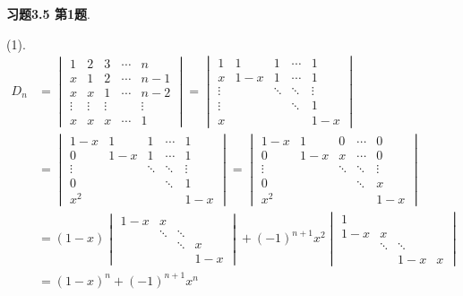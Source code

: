\renewcommand{\newpageorvspace}{\vspace{2em}}

\date{第八次作业}



\maketitle

{\bf 习题3.5 第1题}.

(1). 
\begin{align*}
D_n & = \begin{vmatrix} 1 & 2 & 3 & \cdots & n \\ x & 1 & 2 & \cdots & n-1 \\ x & x & 1 & \cdots & n-2 \\ \vdots & \vdots & \vdots & & \vdots \\ x & x & x & \cdots & 1 \end{vmatrix} = \begin{vmatrix} 1 & 1 & 1 & \cdots & 1 \\ x & 1-x & 1 & \cdots & 1 \\ \vdots & & \ddots & \ddots & \vdots \\ \vdots & & & \ddots & 1 \\ x & & & & 1-x \end{vmatrix} \\
& = \begin{vmatrix} 1-x & 1 & 1 & \cdots & 1 \\ 0 & 1-x & 1 & \cdots & 1 \\ \vdots & & \ddots & \ddots & \vdots \\ 0 & & & \ddots & 1 \\ x^2 & & & & 1-x \end{vmatrix} = \begin{vmatrix} 1-x & 1 & 0 & \cdots & 0 \\ 0 & 1-x & x & \cdots & 0 \\ \vdots & & \ddots & \ddots & \vdots \\ 0 & & & \ddots & x \\ x^2 & & & & 1-x \end{vmatrix} \\
& = (1-x) \begin{vmatrix} 1-x & x & & \\ & \ddots & \ddots & \\ & & \ddots & x \\ & & & 1-x \end{vmatrix} + (-1)^{n+1}x^2 \begin{vmatrix} 1 & & & \\ 1-x & x & & \\ & \ddots & \ddots & \\ & & 1-x & x \end{vmatrix} \\
& = (1-x)^n + (-1)^{n+1}x^n
\end{align*}

